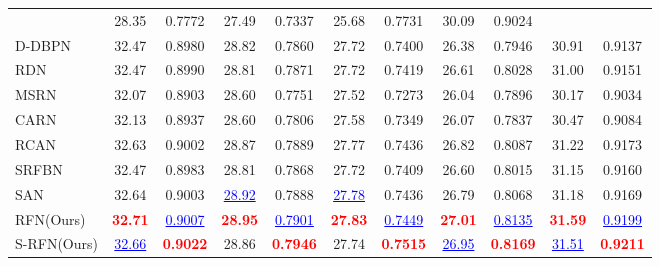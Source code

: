 \documentclass[preprint]{elsarticle}
\begin{document}
\begin{table*}[htpb]
\begin{center}
{\begin{tabular}{|l|c|c|c|c|c|c|c|c|c|c|}
			& 28.35 & 0.7772
			& 27.49 & 0.7337
			& 25.68 & 0.7731
			& 30.09 & 0.9024 \\
			D-DBPN~\cite{DBPN}
			& 32.47 & 0.8980
			& 28.82 & 0.7860
			& 27.72 & 0.7400
			& 26.38 & 0.7946
			& 30.91 & 0.9137 \\
			RDN~\cite{RDN}
			& 32.47 & 0.8990
			& 28.81 & 0.7871
			& 27.72 & 0.7419
			& 26.61 & 0.8028
			& 31.00 & 0.9151 \\
			MSRN~\cite{MSRN}
			& 32.07 & 0.8903
			& 28.60 & 0.7751
			& 27.52 & 0.7273
			& 26.04 & 0.7896
			& 30.17 & 0.9034 \\
			CARN~\cite{CARN}
			& 32.13 & 0.8937
			& 28.60 & 0.7806
			& 27.58 & 0.7349
			& 26.07 & 0.7837
			& 30.47 & 0.9084 \\
			RCAN~\cite{RCAN}
			& 32.63 & 0.9002
			& 28.87 & 0.7889
			& 27.77 & 0.7436
			& 26.82 & 0.8087
			& 31.22 & 0.9173 \\
			SRFBN~\cite{SRFBN}
			& 32.47 & 0.8983
			& 28.81 & 0.7868
			& 27.72 & 0.7409
			& 26.60 & 0.8015
			& 31.15 & 0.9160 \\
			SAN~\cite{SAN}
			& 32.64 & 0.9003
			& \textcolor{blue}{\underline{28.92}} & 0.7888
			& \textcolor{blue}{\underline{27.78}} & 0.7436
			& 26.79 & 0.8068
			& 31.18 & 0.9169 \\
			
			RFN(Ours)
			& \textcolor{red}{\textbf{32.71}} & \textcolor{blue}{\underline{0.9007}}
			& \textcolor{red}{\textbf{28.95}} & \textcolor{blue}{\underline{0.7901}}
			& \textcolor{red}{\textbf{27.83}} & \textcolor{blue}{\underline{0.7449}}
			& \textcolor{red}{\textbf{27.01}} & \textcolor{blue}{\underline{0.8135}}
			& \textcolor{red}{\textbf{31.59}} & \textcolor{blue}{\underline{0.9199}} \\
			S-RFN(Ours)
			& \textcolor{blue}{\underline{32.66}} & \textcolor{red}{\textbf{0.9022}}
			& 28.86 & \textcolor{red}{\textbf{0.7946}}
			& 27.74 & \textcolor{red}{\textbf{0.7515}}
			& \textcolor{blue}{\underline{26.95}} & \textcolor{red}{\textbf{0.8169}} 
			& \textcolor{blue}{\underline{31.51}} & \textcolor{red}{\textbf{0.9211}}
			\\
			\hline
		\end{tabular} }
	\end{center} 
\end{table*}
\end{document}
